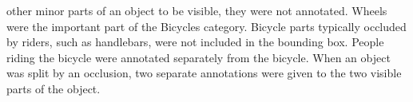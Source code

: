other minor parts of an object to be visible, they were not annotated. 
Wheels were the important part of the Bicycles category.
Bicycle parts typically occluded by riders, such as handlebars, were not included in the bounding box.
People riding the bicycle were annotated separately from the bicycle. When an
object was split by an occlusion, two separate annotations were given to the two
visible parts of the object.
%
\begin{figure}[htb]
    \centering
     \quad
     \quad
    \label{fig:th-image}
\end{figure}